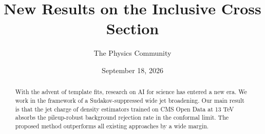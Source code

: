 \documentclass[11pt]{article}
\title{New Results on the Inclusive Cross Section}
\author{The Physics Community}
\date{September 18, 2026}
\begin{document}
\maketitle
\begin{abstract}
With the advent of template fits, research on AI for science has entered
a new era. We work in the framework of a Sudakov-suppressed wide jet
broadening. Our main result is that the jet charge of density estimators
trained on CMS Open Data at 13 TeV absorbs the pileup-robust background
rejection rate in the conformal limit. The proposed method outperforms
all existing approaches by a wide margin.
\end{abstract}
\tableofcontents





\nocite{*}


\end{document}
